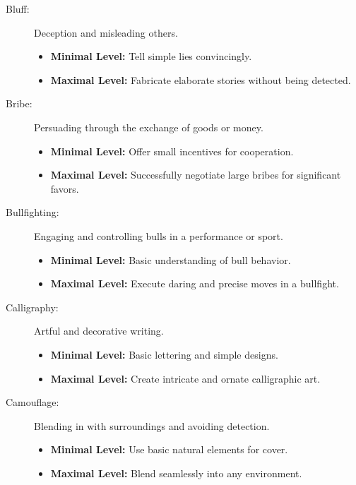 \documentclass[12pt]{book}
\begin{document}
\begin{description}
    \item[Bluff:] Deception and misleading others.
        \begin{itemize}
            \item \textbf{Minimal Level:} Tell simple lies convincingly.
            \item \textbf{Maximal Level:} Fabricate elaborate stories without being detected.
        \end{itemize}

    \item[Bribe:] Persuading through the exchange of goods or money.
        \begin{itemize}
            \item \textbf{Minimal Level:} Offer small incentives for cooperation.
            \item \textbf{Maximal Level:} Successfully negotiate large bribes for significant favors.
        \end{itemize}

    \item[Bullfighting:] Engaging and controlling bulls in a performance or sport.
        \begin{itemize}
            \item \textbf{Minimal Level:} Basic understanding of bull behavior.
            \item \textbf{Maximal Level:} Execute daring and precise moves in a bullfight.
        \end{itemize}

    \item[Calligraphy:] Artful and decorative writing.
        \begin{itemize}
            \item \textbf{Minimal Level:} Basic lettering and simple designs.
            \item \textbf{Maximal Level:} Create intricate and ornate calligraphic art.
        \end{itemize}

    \item[Camouflage:] Blending in with surroundings and avoiding detection.
        \begin{itemize}
            \item \textbf{Minimal Level:} Use basic natural elements for cover.
            \item \textbf{Maximal Level:} Blend seamlessly into any environment.
        \end{itemize}


\end{description}
\end{document}
